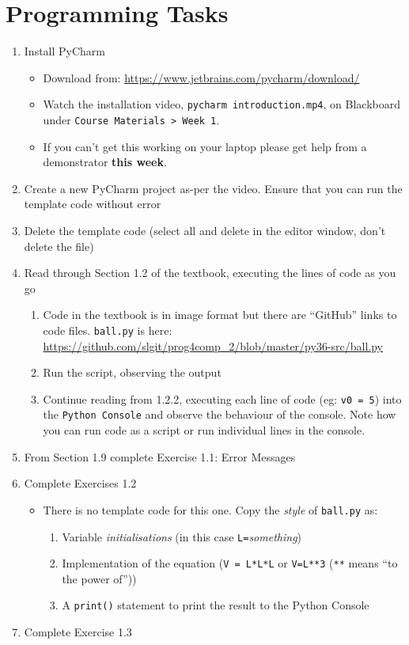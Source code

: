 \documentclass{lab}
\begin{document}
\section{Programming Tasks}

\begin{enumerate}
\item Install PyCharm
	\begin{itemize}
		\item Download from: \url{https://www.jetbrains.com/pycharm/download/}
		\item Watch the installation video, \texttt{pycharm introduction.mp4}, on Blackboard under \texttt{Course Materials > Week 1}.
		\item If you can't get this working on your laptop please get help from a demonstrator \textbf{this week}.
	\end{itemize}
\item Create a new PyCharm project as-per the video. Ensure that you can run the template code without error
\item Delete the template code (select all and delete in the editor window, don't delete the file)
\item Read through Section 1.2 of the textbook, executing the lines of code as you go
	\begin{enumerate}
		\item Code in the textbook is in image format but there are ``GitHub'' links to code files. \texttt{ball.py} is here: \url{https://github.com/slgit/prog4comp_2/blob/master/py36-src/ball.py}
		\item Run the script, observing the output
		\item Continue reading from 1.2.2, executing each line of code (eg: \texttt{v0 = 5}) into the \texttt{Python Console} and observe the behaviour of the console. Note how you can run code as a script or run individual lines in the console.
	\end{enumerate}
\item From Section 1.9 complete Exercise 1.1: Error Messages
\item Complete Exercises 1.2
	\begin{itemize}
		\item There is no template code for this one. Copy the \textit{style} of \texttt{ball.py} as:
			\begin{enumerate}
				\item Variable \textit{initialisations} (in this case \texttt{L=}\textit{something})
				\item Implementation of the equation (\texttt{V = L*L*L} or \texttt{V=L**3} (\texttt{**} means ``to the power of''))
				\item A \texttt{print()} statement to print the result to the Python Console
			\end{enumerate}
	\end{itemize}
\item Complete Exercise 1.3
\end{enumerate}
\end{document}
